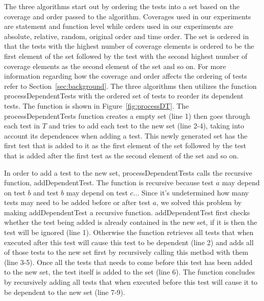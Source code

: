 

The three algorithms start out by ordering the tests into a set 
based on the coverage and order passed to the algorithm.
Coverages used in our experiments are statement
and function level while orders used in our experiments are absolute,
relative, random, original order and time order. The set is ordered
in that the tests with the highest number of coverage elements
is ordered to be the first element of the set followed by the test with
the second highest number of coverage elements as the second
element of the set and so on. For more information regarding how the coverage
and order affects the ordering of tests refer to Section~\ref{sec:background}.
The three algorithms then utilizes the function processDependentTests
with the ordered set of tests to reorder its dependent tests.
The function is shown in Figure~\ref{fig:processDT}.
The processDependentTests function creates a empty set (line 1)
then goes through each test in $\mathit{T}$ and tries to add each
test to the new set (line 2-4), taking into account its dependences
when adding a test. This newly generated set has the first test
that is added to it as the first element of the set followed by the
test that is added after the first test as the second element of the set
and so on.


In order to add a test to the new set, processDependentTests calls
the recursive function, addDependentTest. The function is recursive
because test $\mathit{a}$ may depend on test $\mathit{b}$ and test
$\mathit{b}$ may depend on test $\mathit{c}$... Since it's
undetermined how many tests may need to be added before or after
test $\mathit{a}$, we solved this problem by making addDependentTest
a recursive function. addDependentTest first checks whether the test
being added is already contained in the new set, if it is then the
test will be ignored (line 1). Otherwise the function retrieves all
tests that when executed after this test will cause this test to be
dependent (line 2) and adds all of those tests to the new set first
by recursively calling this method with them (line 3-5). Once all
the tests that needs to come before this test has been added to
the new set, the test itself is added to the set (line 6). The
function concludes by recursively adding all tests that when executed
before this test will cause it to be dependent to the new set (line 7-9).     

